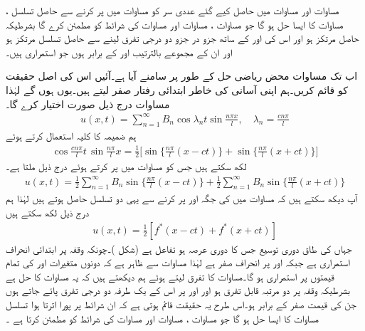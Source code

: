 مساوات  اور مساوات  میں حاصل کیے گئے عددی سر کو مساوات  میں پر کرنے سے حاصل تسلسل ، مساوات  کا ایسا حل ہو گا جو مساوات ، مساوات  اور مساوات  کی شرائط کو مطمئن کرے گا بشرطیکہ  حاصل  مرتکز ہو اور اس  کی  اور  کے ساتھ جزو در جزو  دو  درجی تفرق لینے سے حاصل تسلسل مرتکز   ہو اور ان کے مجموعے  بالترتیب  اور  کے برابر ہوں جو استمراری ہیں۔

اب تک مساوات  محض ریاضی حل کے طور پر سامنے آیا ہے۔آئیں اس کی اصل حقیقت کو قائم کریں۔ہم اپنی آسانی کی خاطر ابتدائی رفتار  صفر لیتے ہیں۔یوں  ہوں  گے لہٰذا مساوات  درج ذیل صورت اختیار کرے گا۔
\begin{align}\label{مساوات_جزوی_متحرک_موج_الف}
u(x,t)=\sum_{n=1}^{\infty} B_n\cos \lambda_n t\sin\frac{n\pi x}{l},\quad \lambda_n=\frac{cn\pi}{l}
\end{align}
ہم ضمیمہ  کا کلیہ  استعمال کرتے ہوئے
\begin{align*}
\cos \frac{cn\pi}{l}t\,\sin\frac{n\pi}{l}x=\frac{1}{2}\big[\sin\big\{\frac{n\pi}{l}(x-ct)\big\}+\sin\big\{\frac{n\pi}{l}(x+ct)\big\}\big]
\end{align*}
لکھ سکتے ہیں جس کو  مساوات   میں پر کرتے ہوئے درج ذیل ملتا ہے۔
\begin{align*}
u(x,t)=\frac{1}{2}\sum_{n=1}^{\infty}B_n \sin\big\{\frac{n\pi}{l}(x-ct)\big\}+\frac{1}{2}\sum_{n=1}^{\infty}B_n \sin\big\{\frac{n\pi}{l}(x+ct)\big\}
\end{align*}
آپ دیکھ سکتے ہیں کہ مساوات  میں  کی جگہ  اور  پر کرنے سے یہی دو تسلسل حاصل ہوتے ہیں لہٰذا ہم درج ذیل لکھ سکتے ہیں
\begin{align}\label{مساوات_جزوی_متحرک_موج_ب}
u(x,t)=\frac{1}{2}[f^*(x-ct)+f^*(x+ct)]
\end{align}
جہاں  کی طاق دوری توسیع جس کا دوری عرصہ  ہو تفاعل  ہے (شکل )۔چونکہ وقفہ  پر ابتدائی انحراف  استمراری ہے جبکہ   اور  پر انحراف صفر ہے لہٰذا مساوات  سے ظاہر ہے کہ  دونوں متغیرات  اور  کی تمام قیمتوں پر استمراری ہو گا۔مساوات  کا تفرق لیتے ہوئے ہم دیکھتے ہیں کہ یہ مساوات  کا حل ہے بشرطیکہ  وقفہ  پر  دو مرتبہ قابل تفرق ہو اور  اور  پر اس کے یک طرفہ دو درجی تفرق پائے جاتے ہوں جن کی قیمت صفر کے برابر ہو۔اس طرح یہ حقیقت قائم ہوتی ہے کہ ان شرائط پر پورا اترتا ہوا تسلسل  مساوات  کا ایسا حل ہو گا جو  مساوات ، مساوات  اور مساوات  کی شرائط کو مطمئن کرتا ہے ۔
